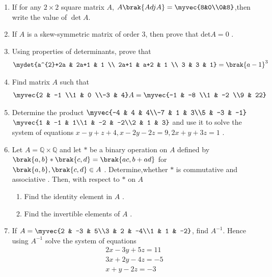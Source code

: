 \begin{enumerate}
\item If for any $2\times2$ square matrix $A$, $A\brak{Adj A} =\myvec{8&0\\0&8}$,then write the value of $\det{A}$.
\item If $A$ is a skew-symmetric matrix of order $3$, then prove that det$ A=0$ .
\item Using properties of determinants, prove that \begin{align*}\mydet{a^{2}+2a & 2a+1 & 1 \\ 2a+1 & a+2 & 1 \\ 3 & 3 & 1} = \brak{a-1}^3\end{align*}
\item Find matrix $A$ such that
\begin{align*}
   \myvec{2 & -1 \\1 & 0 \\-3 & 4} A=\myvec{-1 & -8 \\1 & -2 \\9 & 22} 
\end{align*} 
\item Determine the product	$\myvec{-4 & 4 & 4\\-7 & 1 & 3\\5 & -3 & -1}$ $\myvec{1 & -1 &  1\\1 & -2 & -2\\2 &  1 &  3}$ and use it to solve the system of equations $x-y+z+4, x-2y-2z=9, 2x+y+3z=1$ .
\item Let $A=\mathbb{Q}\times\mathbb{Q}$ and let $*$ be a binary operation  on $A$ defined by $\brak{a, b} *\brak{c, d} = \brak{ac, b+ad}$ for $\brak{a, b}, \brak{c, d} \in A$ . Determine,whether $\ast$ is commutative and associative . Then, with respect to $\ast$ on $A$ 
	\begin{enumerate}
	   \item Find the identity element in $A$ .
      \item Find the invertible elements of $A$ .
	\end{enumerate}
 \item If $A=\myvec{2 & -3 & 5\\3 & 2 & -4\\1 & 1 & -2}$, find $A^{-1}$. Hence using $A^{-1}$ solve the system of equations \begin{align*}
    2x-3y+5z=11\\3x+2y-4z=-5\\x+y-2z=-3
\end{align*}
\end{enumerate}
